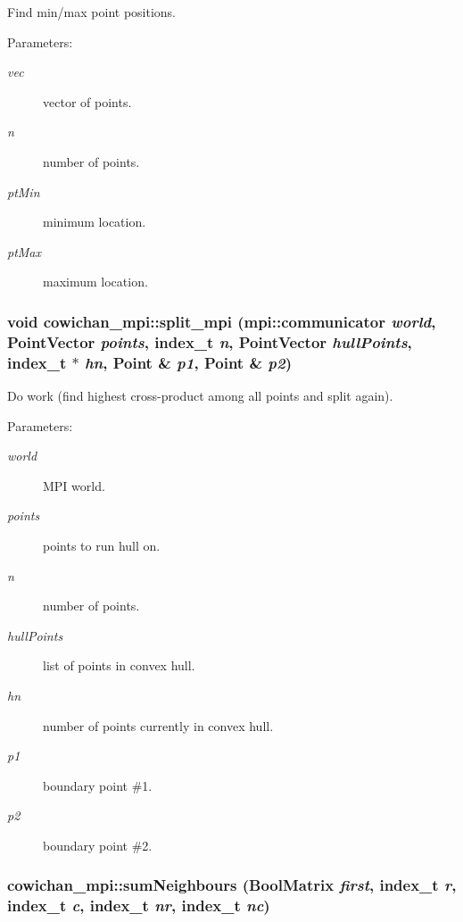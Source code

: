 Find min/max point positions. \begin{Desc}
\item[Parameters:]
\begin{description}
\item[{\em vec}]vector of points. \item[{\em n}]number of points. \item[{\em ptMin}]minimum location. \item[{\em ptMax}]maximum location. \end{description}
\end{Desc}
\hypertarget{namespacecowichan__mpi_c9ddfd8c08bb0f11a90abac20453dd2c}{
\subsubsection[{split\_\-mpi}]{\setlength{\rightskip}{0pt plus 5cm}void cowichan\_\-mpi::split\_\-mpi (mpi::communicator {\em world}, \/  {\bf PointVector} {\em points}, \/  {\bf index\_\-t} {\em n}, \/  {\bf PointVector} {\em hullPoints}, \/  {\bf index\_\-t} $\ast$ {\em hn}, \/  {\bf Point} \& {\em p1}, \/  {\bf Point} \& {\em p2})}}
\label{namespacecowichan__mpi_c9ddfd8c08bb0f11a90abac20453dd2c}


Do work (find highest cross-product among all points and split again). \begin{Desc}
\item[Parameters:]
\begin{description}
\item[{\em world}]MPI world. \item[{\em points}]points to run hull on. \item[{\em n}]number of points. \item[{\em hullPoints}]list of points in convex hull. \item[{\em hn}]number of points currently in convex hull. \item[{\em p1}]boundary point \#1. \item[{\em p2}]boundary point \#2. \end{description}
\end{Desc}
\hypertarget{namespacecowichan__mpi_c244baae47084737f2274a270a24ad46}{
\subsubsection[{sumNeighbours}]{ cowichan\_\-mpi::sumNeighbours ({\bf BoolMatrix} {\em first}, \/  {\bf index\_\-t} {\em r}, \/  {\bf index\_\-t} {\em c}, \/  {\bf index\_\-t} {\em nr}, \/  {\bf index\_\-t} {\em nc})}}
\label{namespacecowichan__mpi_c244baae47084737f2274a270a24ad46}


